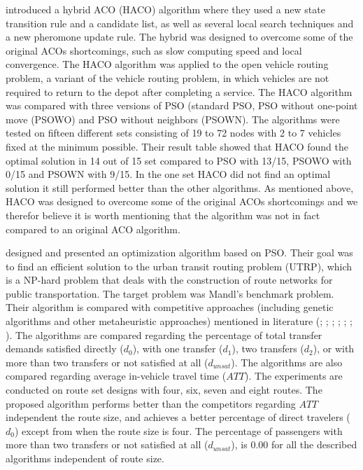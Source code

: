\citet{sedighpour14} introduced a hybrid ACO (HACO) algorithm where they used a new state transition rule and a candidate list, as well as several local search techniques and a new pheromone update rule. The hybrid was designed to overcome some of the original ACOs shortcomings, such as slow computing speed and local convergence. The HACO algorithm was applied to the open vehicle routing problem, a variant of the vehicle routing problem, in which vehicles are not required to return to the depot after completing a service. The HACO algorithm was compared with three versions of PSO (standard PSO, PSO without one-point move (PSOWO) and PSO without neighbors (PSOWN). The algorithms were tested on fifteen different sets consisting of 19 to 72 nodes with 2 to 7 vehicles fixed at the minimum possible. Their result table showed that HACO found the optimal solution in 14 out of 15 set compared to PSO with 13/15, PSOWO with 0/15 and PSOWN with 9/15. In the one set HACO did not find an optimal solution it still performed better than the other algorithms. As mentioned above, HACO was designed to overcome some of the original ACOs shortcomings and we therefor believe it is worth mentioning that the algorithm was not in fact compared to an original ACO algorithm. 

\citet{kechagiopoulos14} designed and presented an optimization algorithm based on PSO. Their goal was to find an efficient solution to the urban transit routing problem (UTRP), which is a NP-hard problem that deals with the construction of route networks for public transportation. The target problem was Mandl's benchmark problem. Their algorithm is compared with competitive approaches (including genetic algorithms and other metaheuristic approaches) mentioned in literature (\citet{baaj91}; \citet{chakroborty02}; \citet{kidwai98}; \citet{fan10}; \citet{fan09-2}; \citet{zhang10}; \citet{chew12}). The algorithms are compared regarding the percentage of total transfer demands satisfied directly ($d_0$), with one transfer ($d_1$), two transfers ($d_2$), or with more than two transfers or not satisfied at all ($d_{unsat}$). The algorithms are also compared regarding average in-vehicle travel time ($ATT$). The experiments are conducted on route set designs with four, six, seven and eight routes. The proposed algorithm performs better than the competitors regarding $ATT$ independent the route size, and achieves a better percentage of direct travelers ($d_0$) except from when the route size is four. The percentage of passengers with more than two transfers or not satisfied at all ($d_{unsat}$), is $0.00$ for all the described algorithms independent of route size. 

